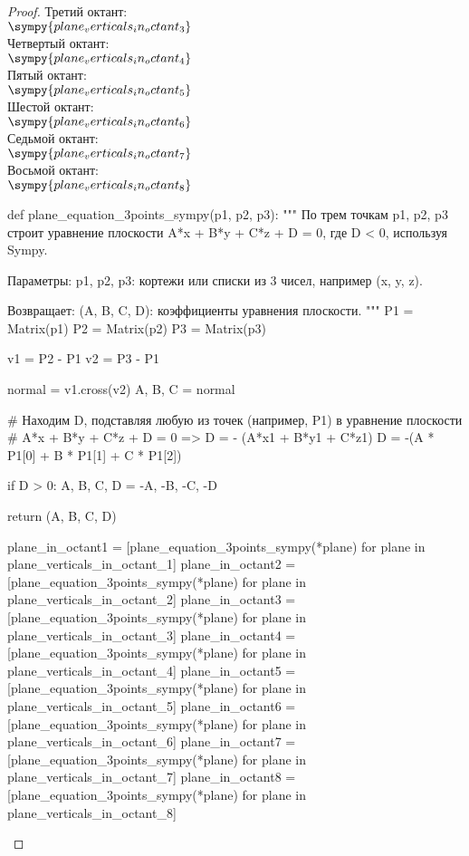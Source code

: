 \begin{proof}
    Третий октант: \\
    \(\sympy{plane_verticals_in_octant_3}\) \\

    Четвертый октант: \\
    \(\sympy{plane_verticals_in_octant_4}\) \\

    Пятый октант: \\
    \(\sympy{plane_verticals_in_octant_5}\) \\

    Шестой октант: \\
    \(\sympy{plane_verticals_in_octant_6}\) \\

    Седьмой октант: \\
    \(\sympy{plane_verticals_in_octant_7}\) \\

    Восьмой октант: \\
    \(\sympy{plane_verticals_in_octant_8}\)

    \begin{sympycode}
def plane_equation_3points_sympy(p1, p2, p3):
    """
    По трем точкам p1, p2, p3 строит уравнение плоскости A*x + B*y + C*z + D = 0,
    где D < 0, используя Sympy.
    
    Параметры:
    p1, p2, p3: кортежи или списки из 3 чисел, например (x, y, z).
    
    Возвращает:
    (A, B, C, D): коэффициенты уравнения плоскости.
    """
    P1 = Matrix(p1)
    P2 = Matrix(p2)
    P3 = Matrix(p3)
    
    v1 = P2 - P1
    v2 = P3 - P1
    
    normal = v1.cross(v2)  
    A, B, C = normal
    
    # Находим D, подставляя любую из точек (например, P1) в уравнение плоскости
    # A*x + B*y + C*z + D = 0  =>  D = - (A*x1 + B*y1 + C*z1)
    D = -(A * P1[0] + B * P1[1] + C * P1[2])
    
    if D > 0:
        A, B, C, D = -A, -B, -C, -D

    return (A, B, C, D)
\end{sympycode}

    \begin{sympycode}
plane_in_octant1 = [plane_equation_3points_sympy(*plane) for plane in plane_verticals_in_octant_1]
plane_in_octant2 = [plane_equation_3points_sympy(*plane) for plane in plane_verticals_in_octant_2]
plane_in_octant3 = [plane_equation_3points_sympy(*plane) for plane in plane_verticals_in_octant_3]
plane_in_octant4 = [plane_equation_3points_sympy(*plane) for plane in plane_verticals_in_octant_4]
plane_in_octant5 = [plane_equation_3points_sympy(*plane) for plane in plane_verticals_in_octant_5]
plane_in_octant6 = [plane_equation_3points_sympy(*plane) for plane in plane_verticals_in_octant_6]
plane_in_octant7 = [plane_equation_3points_sympy(*plane) for plane in plane_verticals_in_octant_7]
plane_in_octant8 = [plane_equation_3points_sympy(*plane) for plane in plane_verticals_in_octant_8]


\end{sympycode}
\end{proof}
